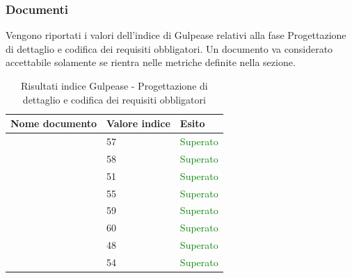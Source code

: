 	 	\subsubsection{Documenti}	 	
	 	Vengono riportati i valori dell'indice di Gulpease relativi alla fase Progettazione di dettaglio e codifica dei requisiti obbligatori. Un documento va considerato accettabile solamente se rientra nelle metriche definite nella sezione.
		\begin{table}[!ht]
			\begin{center}
				\begin{tabularx}{0.9\textwidth}{|l|l|X|}
					\hline
					\textbf{Nome documento} & \textbf{Valore indice} & \textbf{Esito}\\
					\hline						
					\docNameVersionAdR & 57 & \textcolor{green}{Superato}\\
					\hline
					\docNameVersionDdP & 58 & \textcolor{green}{Superato}\\
					\hline
					\docNameVersionGlo & 51 & \textcolor{green}{Superato}\\
					\hline					
					\docNameVersionNdP & 55 & \textcolor{green}{Superato}\\
					\hline					
					\docNameVersionPdP & 59 & \textcolor{green}{Superato}\\
					\hline					
					\docNameVersionPdQ & 60 & \textcolor{green}{Superato}\\
					\hline					
					\docNameVersionSdF & 48 & \textcolor{green}{Superato}\\
					\hline	
					\docNameVersionST & 54 & \textcolor{green}{Superato}\\
					\hline			
				\end{tabularx}
			\end{center}
			\caption{Risultati indice Gulpease - Progettazione di dettaglio e codifica dei requisiti obbligatori}
		\end{table}
		
